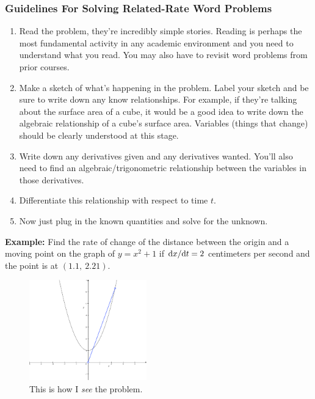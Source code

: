 \documentclass[12pt,addpoints, answers, fleqn]{exam}
\begin{document}
\subsubsection{Guidelines For Solving Related-Rate Word Problems}

\begin{enumerate}
\item Read the problem, they're incredibly simple stories. Reading is perhaps the most fundamental activity in any academic environment and you need to understand what you read. You may also have to revisit word problems from prior courses.
\item Make a sketch of what's happening in the problem. Label your sketch and be sure to write down any know relationships. For example, if they're talking about the surface area of a cube, it would be a good idea to write down the algebraic relationship of a cube's surface area. Variables (things that change) should be clearly understood at this stage.
\item Write down any derivatives given and any derivatives wanted. You'll also need to find an algebraic/trigonometric relationship between the variables in those derivatives.
\item Differentiate this relationship with respect to time $t$.
\item Now just plug in the known quantities and solve for the unknown.

\end{enumerate}

\textbf{Example:}  Find the rate of change of the distance between the origin and a moving point on the graph of $y = x^2 + 1$ if ${\rm{d}}x/{{\rm{d}}t}=2$  centimeters per second and the point is at $\left( 1.1, \ 2.21 \right)$.

\begin{figure}[htbp] %
   \centering
   \includegraphics[width=2in]{./graphics/graph1901.pdf} 
   \caption{This is how I \emph{see} the problem.}
   \label{fig:graph1901}
\end{figure}
\end{document}
